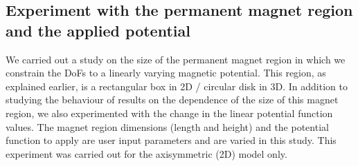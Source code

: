 \documentclass[11pt,a4paper,final]{article}
\begin{document}
\subsection{Experiment with the permanent magnet region and the applied potential}
We carried out a study on the size of the permanent magnet region in which we constrain the DoFs to a linearly varying magnetic potential. This region, as explained earlier, is a rectangular box in 2D / circular disk in 3D. In addition to studying the behaviour of results on the dependence of the size of this magnet region, we also experimented with the change in the linear potential function values. The magnet region dimensions (length and height) and the potential function to apply are user input parameters and are varied in this study. This experiment was carried out for the axisymmetric (2D) model only.\par 
\end{document}
